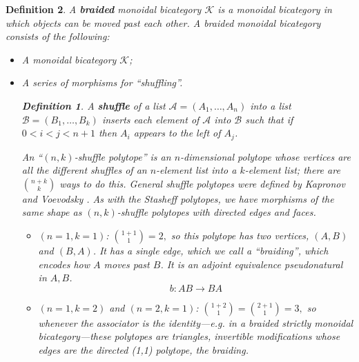 \documentclass[12pt,twoside,openright]{report}
\newtheorem{defn}{Definition}
\newcommand{\C}{ {\mathcal{K}}  }
\begin{document}
\begin{defn}
  A {\bf braided} monoidal bicategory $\C$ is a monoidal bicategory in which objects can be moved past each other.  A braided monoidal bicategory consists of the following:
  \begin{itemize}
    \item A monoidal bicategory $\C$;
    \item A series of morphisms for ``shuffling''.  
    \begin{defn}
      A {\bf shuffle} of a list $\mathcal{A} = (A_1, \ldots, A_n)$ into a list $\mathcal{B} = (B_1, \ldots, B_k)$ inserts each element of
$\mathcal{A}$ into $\mathcal{B}$ such that if $0 < i < j < n+1$ then
$A_i$ appears to the left of $A_j$.
    \end{defn}

    An ``$(n,k)$-shuffle polytope'' is an $n$-dimensional polytope whose vertices are all the different shuffles of an $n$-element list into a
$k$-element list; there are ${n+k \choose k}$ ways to do this.  General shuffle polytopes were defined by Kapronov and Voevodsky \cite{KV94}. As with the Stasheff polytopes, we have morphisms of the same shape as $(n, k)$-shuffle polytopes with directed edges and faces.
    \begin{itemize}
      \item $(n=1,k=1)$: ${{1+1} \choose 1} = 2,$ so this polytope has two vertices, $(A,B)$ and $(B,A)$.  It has a single edge, which we call a ``braiding'', which encodes how $A$ moves past $B$.  It is an adjoint equivalence pseudonatural in $A, B$.
        \[ b:AB \to BA \]
      \item $(n=1,k=2)$ and $(n=2,k=1)$: ${{1+2} \choose 1} = {{2+1}
\choose 1} = 3,$ so whenever the associator is the identity---{\em e.g.} in a braided strictly monoidal bicategory---these polytopes are triangles, invertible modifications whose edges are the directed (1,1) polytope, the braiding.
        \begin{center}

\end{center}
\end{itemize}
\end{itemize}
\end{defn}
\end{document}
